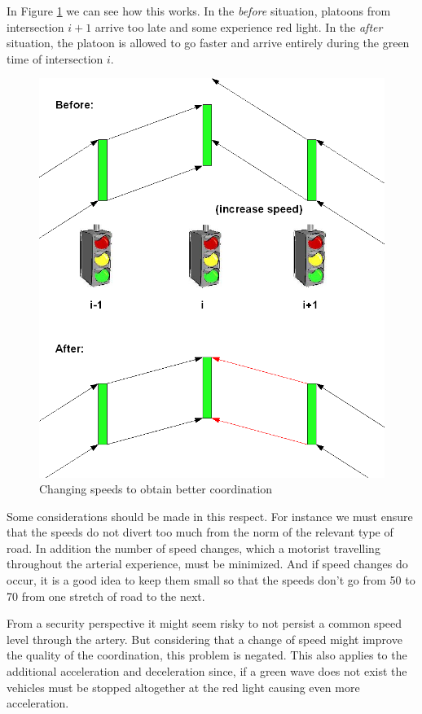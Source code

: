 In Figure \ref{fig:change_speed} we can see how this works. In the \textit{before} situation, platoons from intersection $i+1$ arrive too late and some experience red light. In the \textit{after} situation, the platoon is allowed to go faster and arrive entirely during the green time of intersection $i$.

\begin{figure}[htbp]
\centering
\includegraphics[scale=0.4]{change_speed.png}
\caption{Changing speeds to obtain better coordination}
\label{fig:change_speed}
\end{figure}

Some considerations should be made in this respect. For instance we must ensure that the speeds do not divert too much from the norm of the relevant type of road. In addition the number of speed changes, which a motorist travelling throughout the arterial experience, must be minimized. And if speed changes do occur, it is a good idea to keep them small so that the speeds don't go from 50 to 70 from one stretch of road to the next.

From a security perspective it might seem risky to not persist a common speed level through the artery. But considering that a change of speed might improve the quality of the coordination, this problem is negated. This also applies to the additional acceleration and deceleration since, if a green wave does not exist the vehicles must be stopped altogether at the red light causing even more acceleration.


